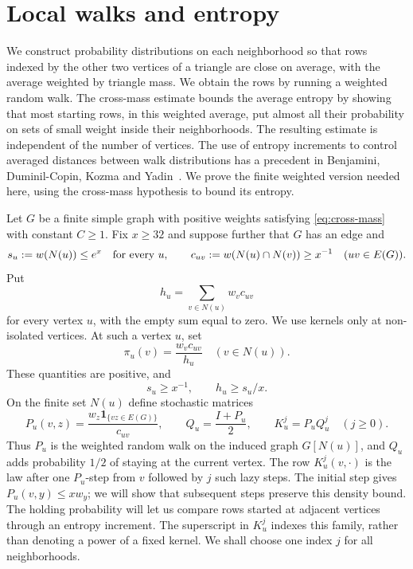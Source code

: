 \section{Local walks and entropy}
\label{sec:entropy}

We construct probability distributions on each neighborhood so that rows
indexed by the other two vertices of a triangle are close on average,
with the average weighted by triangle mass.  We obtain the rows by running
a weighted random walk.  The cross-mass estimate bounds the average entropy
by showing that most starting rows, in this weighted average, put almost
all their probability on sets of small weight inside their neighborhoods.
The resulting estimate is independent of the number of vertices.
The use of entropy increments to control averaged distances between
walk distributions has a precedent in Benjamini, Duminil-Copin, Kozma
and Yadin~\cite[Section~2]{BDKY2015}.
We prove the finite weighted version needed here, using the cross-mass
hypothesis to bound its entropy.

Let $G$ be a finite simple graph with positive weights satisfying
\eqref{eq:cross-mass} with constant $C\ge1$.
Fix $x\ge32$ and suppose further that $G$ has an edge and
\begin{equation}
 s_u:=w(N(u))\le e^x\quad\hbox{for every $u$},\qquad
 c_{uv}:=w(N(u)\cap N(v))\ge x^{-1}\quad(uv\in E(G)).
 \label{eq:walk-hypotheses}
\end{equation}
Put
\[
 h_u=\sum_{v\in N(u)}w_vc_{uv}
\]
for every vertex $u$, with the empty sum equal to zero.  We use kernels
only at non-isolated vertices.  At such a vertex $u$, set
\[
 \pi_u(v)=\frac{w_vc_{uv}}{h_u}\quad(v\in N(u)).
\]
These quantities are positive, and
\begin{equation}
 s_u\ge x^{-1},\qquad h_u\ge s_u/x.
 \label{eq:walk-lower-bounds}
\end{equation}
On the finite set $N(u)$ define stochastic matrices
\begin{equation}
 P_u(v,z)=\frac{w_z\mathbf1_{\{vz\in E(G)\}}}{c_{uv}},\qquad
 Q_u=\frac{I+P_u}{2},\qquad K_u^j=P_uQ_u^j\quad(j\ge0).
 \label{eq:walk-kernels}
\end{equation}
Thus $P_u$ is the weighted random walk on the induced graph $G[N(u)]$,
and $Q_u$ adds probability $1/2$ of staying at the current vertex.
The row $K_u^j(v,\cdot)$ is the law after one $P_u$-step from $v$ followed
by $j$ such lazy steps.  The initial step gives
$P_u(v,y)\le xw_y$; we will show that subsequent steps preserve this
density bound.  The holding probability will let us compare rows started
at adjacent vertices through an entropy increment.
The superscript in $K_u^j$ indexes this family, rather than denoting a
power of a fixed kernel.  We shall choose one index $j$ for all neighborhoods.

